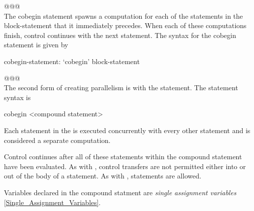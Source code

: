 \noindent @@@\hrulefill \\
The cobegin statement spawns a computation for each of the statements
in the block-statement that it immediately precedes.  When each of
these computations finish, control continues with the next statement.
The syntax for the cobegin statement is given by
\begin{syntax}
cobegin-statement:
  `cobegin' block-statement
\end{syntax}
\noindent @@@\hrulefill \\

The second form of creating parallelism is with the 
statement. The  statement syntax is
\begin{chapel}
cobegin <compound statement> 
\end{chapel}
Each statement in the  is executed 
concurrently with every other statement and is considered a separate 
computation.

Control continues after all of these statements within the compound
statement have been evaluated. As with , control
transfers are not permitted either into or out of the body of a
 statement. As with , 
statements are allowed.

Variables declared in the  compound statment are {\em single
assignment variables} \ref{Single_Assignment_Variables}. 
